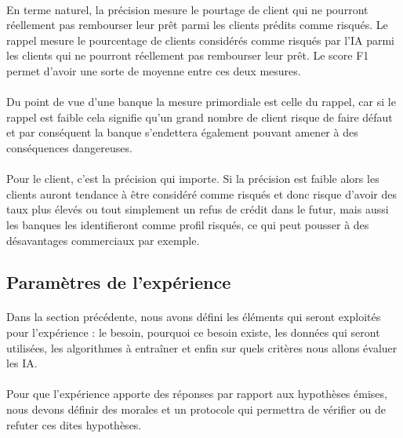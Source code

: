 \documentclass[10pt, french, a4paper]{report}
\begin{document}
\paragraph{}
En terme naturel, la précision mesure le pourtage de client qui ne pourront réellement pas rembourser leur prêt parmi les clients prédits comme risqués. Le rappel mesure le pourcentage de clients considérés comme risqués par l'IA parmi les clients qui ne pourront réellement pas rembourser leur prêt. Le score F1 permet d'avoir une sorte de moyenne entre ces deux mesures.

\paragraph{}
Du point de vue d'une banque la mesure primordiale est celle du rappel, car si le rappel est faible cela signifie qu'un grand nombre de client risque de faire défaut et par conséquent la banque s'endettera également pouvant amener à des conséquences dangereuses.

\paragraph{}
Pour le client, c'est la précision qui importe. Si la précision est faible alors les clients auront tendance à être considéré comme risqués et donc risque d'avoir des taux plus élevés ou tout simplement un refus de crédit dans le futur, mais aussi les banques les identifieront comme profil risqués, ce qui peut pousser à des désavantages commerciaux par exemple.


\subsection{Paramètres de l'expérience}

\paragraph{}
Dans la section précédente, nous avons défini les éléments qui seront exploités pour l'expérience : le besoin, pourquoi ce besoin existe, les données qui seront utilisées, les algorithmes à entraîner et enfin sur quels critères nous allons évaluer les IA.

\paragraph{}
Pour que l'expérience apporte des réponses par rapport aux hypothèses émises, nous devons définir des morales et un protocole qui permettra de vérifier ou de refuter ces dites hypothèses.
\end{document}
